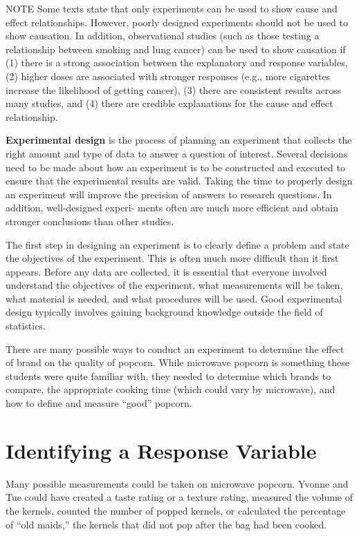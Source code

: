 \documentclass[
]{report}
\begin{document}
NOTE
Some texts state that only experiments can be used to show cause and effect relationships. However, poorly
designed experiments should not be used to show causation. In addition, observational studies (such as
those testing a relationship between smoking and lung cancer) can be used to show causation if (1) there is
a strong association between the explanatory and response variables, (2) higher doses are associated with
stronger responses (e.g., more cigarettes increase the likelihood of getting cancer), (3) there are consistent
results across many studies, and (4) there are credible explanations for the cause and effect relationship.

\textbf{Experimental design} is the process of planning an experiment that collects the right amount and type
of data to answer a question of interest. Several decisions need to be made about how an experiment is to be
constructed and executed to ensure that the experimental results are valid. Taking the time to properly design
an experiment will improve the precision of answers to research questions. In addition, well-designed experi-
ments often are much more efficient and obtain stronger conclusions than other studies.

The first step in designing an experiment is to clearly define a problem and state the objectives of the
experiment. This is often much more difficult than it first appears. Before any data are collected, it is essential
that everyone involved understand the objectives of the experiment, what measurements will be taken, what
material is needed, and what procedures will be used. Good experimental design typically involves gaining
background knowledge outside the field of statistics.

There are many possible ways to conduct an experiment to determine the effect of brand on the quality
of popcorn. While microwave popcorn is something these students were quite familiar with, they needed to
determine which brands to compare, the appropriate cooking time (which could vary by microwave), and how
to define and measure ``good'' popcorn.

\section{Identifying a Response Variable}\label{identifying-a-response-variable}

Many possible measurements could be taken on microwave popcorn. Yvonne and Tue could have created a
taste rating or a texture rating, measured the volume of the kernels, counted the number of popped kernels, or
calculated the percentage of ``old maids,'' the kernels that did not pop after the bag had been cooked.
\end{document}
